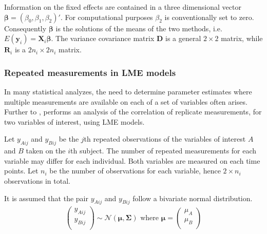 \documentclass[12pt, a4paper]{report}
\theoremstyle{plain}
\theoremstyle{definition}
\theoremstyle{remark}
\begin{document}
	Information on the fixed effects are contained in a three dimensional vector $\boldsymbol{\beta} = (\beta_{0},\beta_{1},\beta_{2})\prime$. For computational purposes $\beta_{2}$ is conventionally set to zero. Consequently $\boldsymbol{\beta}$ is the solutions of the means of the two methods, i.e. $E(\boldsymbol{y}_{i})  = \boldsymbol{X}_{i}\boldsymbol{\beta}$. The variance covariance matrix $\boldsymbol{D}$ is a general $2 \times 2$ matrix, while $\boldsymbol{R}_{i}$ is a $2n_{i} \times 2n_{i}$ matrix.
	
	
	
	
	
	
	
	\subsubsection{Repeated measurements in LME models}
	
	In many statistical analyzes, the need to determine parameter estimates where multiple measurements are available on each of a set of variables often arises. Further to \citet{lam}, \citet{hamlett} performs an analysis of the correlation of replicate measurements, for two variables of interest, using LME models.
	
	Let $y_{Aij}$ and $y_{Bij}$ be the $j$th repeated observations of the variables of interest $A$ and $B$ taken on the $i$th subject. The number of repeated measurements for each variable may differ for each individual.
	Both variables are measured on each time points. Let $n_{i}$ be the number of observations for each variable, hence $2\times n_{i}$ observations in total.
	
	It is assumed that the pair $y_{Aij}$ and $y_{Bij}$ follow a bivariate normal distribution.
	\begin{eqnarray*}
		\left(
		\begin{array}{c}
			y_{Aij} \\
			y_{Bij} \\
		\end{array}
		\right) \sim \mathcal{N}(
		\boldsymbol{\mu}, \boldsymbol{\Sigma})\mbox{   where } \boldsymbol{\mu} = \left(
		\begin{array}{c}
			\mu_{A} \\
			\mu_{B} \\
		\end{array}
		\right)
	\end{eqnarray*}
	
\end{document}

